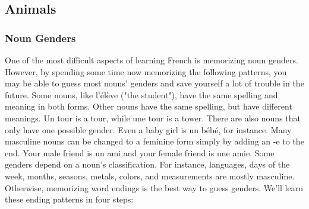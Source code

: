 \pagebreak
\subsection{Animals}

\subsubsection{Noun Genders}

One of the most difficult aspects of learning French is memorizing noun genders. However, by spending some time now memorizing the following patterns, you may be able to guess most nouns' genders and save yourself a lot of trouble in the future.  Some nouns, like l'élève ("the student"), have the same spelling and meaning in both forms. Other nouns have the same spelling, but have different meanings. Un tour is a tour, while une tour is a tower. There are also nouns that only have one possible gender. Even a baby girl is un bébé, for instance. Many masculine nouns can be changed to a feminine form simply by adding an -e to the end. Your male friend is un ami and your female friend is une amie.  Some genders depend on a noun's classification. For instance, languages, days of the week, months, seasons, metals, colors, and measurements are mostly masculine.  Otherwise, memorizing word endings is the best way to guess genders. We'll learn these ending patterns in four steps:

